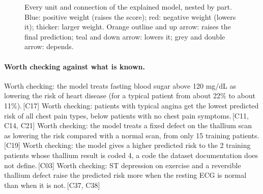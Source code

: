 \documentclass[a4paper,10pt]{article}
\newif\ifreviewmarks
\newcommand{\reviewrule}{\noindent{\color{BrickRed}\rule{\linewidth}{0.8pt}}}
\newenvironment{drafted}[1][]{%
  \ifreviewmarks\par\addvspace{\medskipamount}\reviewrule\par\nopagebreak
  \noindent{\color{BrickRed}\sffamily\footnotesize\textbf{Thesis Draft}\quad #1\hfill review}\par\nopagebreak\smallskip\fi}{%
  \ifreviewmarks\par\smallskip\noindent{\color{BrickRed}\sffamily\footnotesize end of thesis draft}\par\nopagebreak\reviewrule\par\medskip\fi}
\begin{document}
\begin{drafted}[plain-language layer: heart-s5-c1]
\begin{landscape}
\begin{figure}[p]
{}%
\caption{Every unit and connection of the explained model, nested by part. Blue: positive weight (raises the score); red: negative weight (lowers it); thicker: larger weight. Orange outline and up arrow: raises the final prediction; teal and down arrow: lowers it; grey and double arrow: depends.}
\label{fig:hearts5c1:overview}
\end{figure}
\end{landscape}
\paragraph{Worth checking against what is known.} Worth checking: the model treats fasting blood sugar above 120 mg/dL as lowering the risk of heart disease (for a typical patient from about 22\% to about 11\%).\,{\scriptsize\textcolor{NavyBlue}{[C17]}} Worth checking: patients with typical angina get the lowest predicted risk of all chest pain types, below patients with no chest pain symptoms.\,{\scriptsize\textcolor{NavyBlue}{[C11, C14, C21]}} Worth checking: the model treats a fixed defect on the thallium scan as lowering the risk compared with a normal scan, from only 15 training patients.\,{\scriptsize\textcolor{NavyBlue}{[C19]}} Worth checking: the model gives a higher predicted risk to the 2 training patients whose thallium result is coded 4, a code the dataset documentation does not define.\,{\scriptsize\textcolor{NavyBlue}{[C03]}} Worth checking: ST depression on exercise and a reversible thallium defect raise the predicted risk more when the resting ECG is normal than when it is not.\,{\scriptsize\textcolor{NavyBlue}{[C37, C38]}}

\end{drafted}
\end{document}
